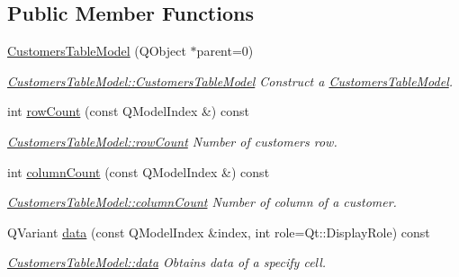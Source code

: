 \subsection*{Public Member Functions}
\begin{DoxyCompactItemize}
\item 
\hyperlink{classGui_1_1Widgets_1_1WdgModels_1_1CustomersTableModel_a51344d4c37da74da6527e7a41e9fff6b}{Customers\-Table\-Model} (Q\-Object $\ast$parent=0)
\begin{DoxyCompactList}\small\item\em \hyperlink{classGui_1_1Widgets_1_1WdgModels_1_1CustomersTableModel_a51344d4c37da74da6527e7a41e9fff6b}{Customers\-Table\-Model\-::\-Customers\-Table\-Model} Construct a \hyperlink{classGui_1_1Widgets_1_1WdgModels_1_1CustomersTableModel}{Customers\-Table\-Model}. \end{DoxyCompactList}\item 
int \hyperlink{classGui_1_1Widgets_1_1WdgModels_1_1CustomersTableModel_a872cf3156efd50f6d03f8700aa502962}{row\-Count} (const Q\-Model\-Index \&) const 
\begin{DoxyCompactList}\small\item\em \hyperlink{classGui_1_1Widgets_1_1WdgModels_1_1CustomersTableModel_a872cf3156efd50f6d03f8700aa502962}{Customers\-Table\-Model\-::row\-Count} Number of customers row. \end{DoxyCompactList}\item 
int \hyperlink{classGui_1_1Widgets_1_1WdgModels_1_1CustomersTableModel_a50a7dd6359eadce3011d86f0aa3b0362}{column\-Count} (const Q\-Model\-Index \&) const 
\begin{DoxyCompactList}\small\item\em \hyperlink{classGui_1_1Widgets_1_1WdgModels_1_1CustomersTableModel_a50a7dd6359eadce3011d86f0aa3b0362}{Customers\-Table\-Model\-::column\-Count} Number of column of a customer. \end{DoxyCompactList}\item 
Q\-Variant \hyperlink{classGui_1_1Widgets_1_1WdgModels_1_1CustomersTableModel_a56f0da4118917c722bc27eb907e7e5fa}{data} (const Q\-Model\-Index \&index, int role=Qt\-::\-Display\-Role) const 
\begin{DoxyCompactList}\small\item\em \hyperlink{classGui_1_1Widgets_1_1WdgModels_1_1CustomersTableModel_a56f0da4118917c722bc27eb907e7e5fa}{Customers\-Table\-Model\-::data} Obtains data of a specify cell. \end{DoxyCompactList}\item 

\end{DoxyCompactItemize}
